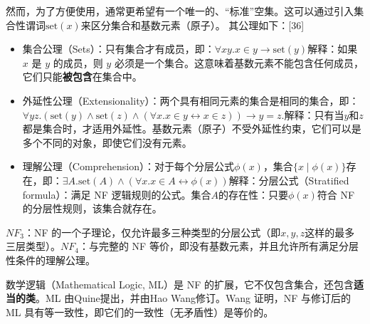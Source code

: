 然而，为了方便使用，通常更希望有一个唯一的、“标准”空集。这可以通过引入集合性谓词\( \text{set}(x)\)来区分集合和基数元素（原子）。  
其公理如下：[36]
\begin{itemize}
\item 集合公理（Sets）：只有集合才有成员，即：\(\forall x y . x \in y \to \text{set}(y)\)解释：如果 \( x \) 是 \( y \) 的成员，则 \( y \) 必须是一个集合。这意味着基数元素不能包含任何成员，它们只能\textbf{被包含}在集合中。
\item 外延性公理（Extensionality）：两个具有相同元素的集合是相同的集合，即：\(\forall y z . (\text{set}(y) \land \text{set}(z) \land (\forall x . x \in y \leftrightarrow x \in z)) \to y = z.\)解释：只有当\( y \)和\( z \)都是集合时，才适用外延性。基数元素（原子）不受外延性约束，它们可以是多个不同的对象，即使它们没有元素。
\item 理解公理（Comprehension）：对于每个分层公式\(\phi(x)\)，集合\(\{x \mid \phi(x)\}\)存在，即：\(\exists A . \text{set}(A) \land (\forall x . x \in A \leftrightarrow \phi(x))\)解释：分层公式（Stratified formula）：满足 NF 逻辑规则的公式。集合\(A\)的存在性：只要\(\phi(x)\)符合 NF 的分层性规则，该集合就存在。
\end{itemize}
\(NF_3\)：NF 的一个子理论，仅允许最多三种类型的分层公式（即\(x, y, z\)这样的最多三层类型）。\(NF_4\)：与完整的 NF 等价，即没有基数元素，并且允许所有满足分层性条件的理解公理。

数学逻辑（Mathematical Logic, ML）是 NF 的扩展，它不仅包含集合，还包含\textbf{适当的类}。ML 由Quine提出，并由Hao Wang修订。Wang 证明，NF 与修订后的 ML 具有等一致性，即它们的一致性（无矛盾性）是等价的。
